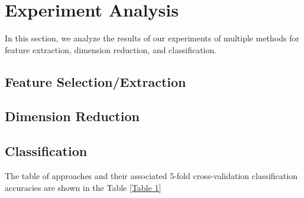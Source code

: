 \section{Experiment Analysis}
In this section, we analyze the results of our experiments of multiple methods for feature extraction, dimension reduction, and classification. 
\subsection{Feature Selection/Extraction}

\subsection{Dimension Reduction}
\subsection{Classification}


The table of approaches and their associated 5-fold cross-validation classification accuracies are shown in the Table \ref{Table 1}

